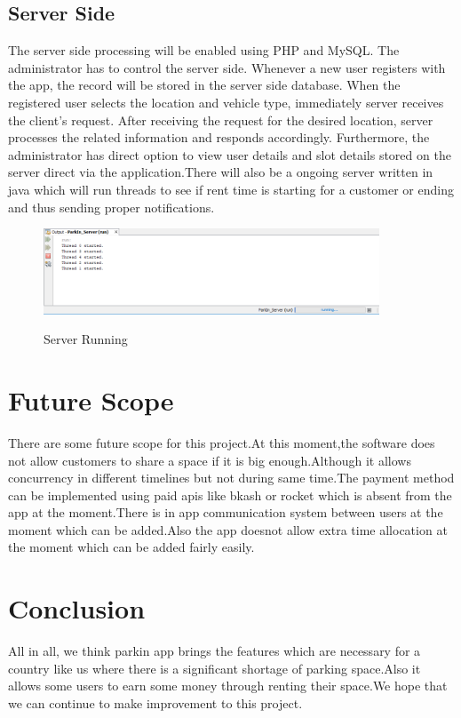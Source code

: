 \documentclass[12pt, english]{article}
\begin{document}
\subsection{Server Side}
The server side processing will be enabled using PHP and MySQL. The administrator has to control the server side. Whenever a new user registers with the app, the record will be stored in the server side database. When the registered user selects the location and vehicle type, immediately server receives the client’s request. After receiving the request for the desired location, server processes the related information and responds accordingly. Furthermore, the administrator has direct option to view user details and slot details stored on the server direct via the application.There will also be a ongoing server written in java which will run threads to see if rent time is starting for a customer or ending and thus sending proper notifications.
\begin{figure}[h!]
        \begin{minipage}[b]{1\linewidth}
        \centering
        \includegraphics[width=10cm]{parkin_server.png}
        \label{arch40}
        \caption{Server Running}
        \end{minipage}
\end{figure}
\section{Future Scope}
There are some future scope for this project.At this moment,the software does not allow customers to share a space if it is big enough.Although it allows concurrency in different timelines but not during same time.The payment method can be implemented using paid apis like bkash or rocket which is absent from the app at the moment.There is in app communication system between users at the moment which can be added.Also the app doesnot allow extra time allocation at the moment which can be added fairly easily.
\section{Conclusion}
All in all, we think parkin app brings the features which are necessary for a country like us where there is a significant shortage of parking space.Also it allows some users to earn some money through renting their space.We hope that we can continue to make improvement to this project.
\end{document}
